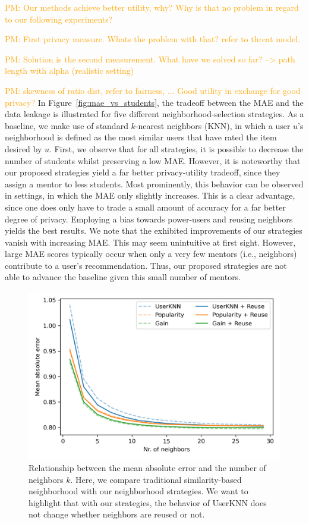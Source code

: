 \documentclass[manuscript,review,anonymous]{acmart}
\newcommand{\pmu}[1]{
        \textcolor{orange}{PM: #1}}
\begin{document}
\pmu{Our methods achieve better utility, why? Why is that no problem in regard to our following experiments?}
\pmu{First privacy measure. Whats the problem with that? refer to threat model.}
\pmu{Solution is the second measurement. What have we solved so far? --> path length with alpha (realistic setting)}
\pmu{skewness of ratio dist, refer to fairness, ... Good utility in exchange for good privacy?}
In Figure~\ref{fig:mae_vs_students}, the tradeoff between the MAE and the data leakage is illustrated for five different neighborhood-selection strategies.
As a baseline, we make use of standard $k$-nearest neighbors (KNN), in which a user $u$'s neighborhood is defined as the most similar users that have rated the item desired by $u$.
First, we observe that for all strategies, it is possible to decrease the number of students whilst preserving a low MAE.
However, it is noteworthy that our proposed strategies yield a far better privacy-utility tradeoff, since they assign a mentor to less students.
Most prominently, this behavior can be observed in settings, in which the MAE only slightly increases.
This is a clear advantage, since one does only have to trade a small amount of accuracy for a far better degree of privacy.
Employing a bias towards power-users and reusing neighbors yields the best results.
We note that the exhibited improvements of our strategies vanish with increasing MAE.
This may seem unintuitive at first sight.
However, large MAE scores typically occur when only a very few mentors (i.e., neighbors) contribute to a user's recommendation.
Thus, our proposed strategies are not able to advance the baseline given this small number of mentors.

\begin{figure}
    \centering
    \includegraphics[width=0.6\linewidth]{figures/ml-100k/k_vs_mae.png}
    \caption{Relationship between the mean absolute error and the number of neighbors $k$. Here, we compare traditional similarity-based neighborhood with our neighborhood strategies. We want to highlight that with our strategies, the behavior of UserKNN does not change whether neighbors are reused or not.}
    \label{fig:k_vs_mae}
\end{figure}
\end{document}
